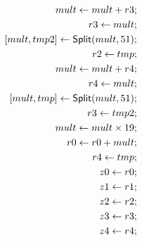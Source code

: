 \begin{align*}
mult \leftarrow mult + r3; \\
r3 \leftarrow mult; \\
{[}{mult}, {tmp2}{]} \leftarrow \mbox{\textsf{Split}}(mult, 51); \\
r2 \leftarrow tmp; \\
mult \leftarrow mult + r4; \\
r4 \leftarrow mult; \\
{[}{mult}, {tmp}{]} \leftarrow \mbox{\textsf{Split}}(mult, 51); \\
r3 \leftarrow tmp2; \\
mult \leftarrow mult \times 19; \\
r0 \leftarrow r0 + mult; \\
r4 \leftarrow tmp; \\
z0 \leftarrow r0; \\
z1 \leftarrow r1; \\
z2 \leftarrow r2; \\
z3 \leftarrow r3; \\
z4 \leftarrow r4;
\end{align*}

